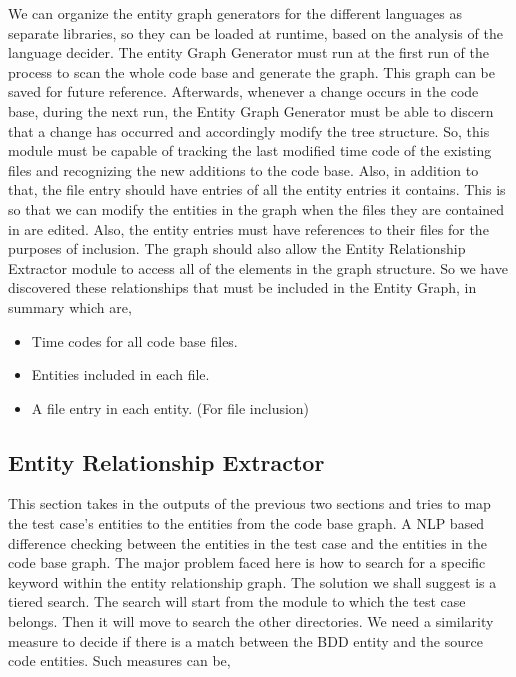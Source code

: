 \documentclass[conference, onecolumn, a4, 12pt]{IEEEtran}
\begin{document}
We can organize the entity graph generators for the different languages as separate libraries, so they can be loaded at runtime, based on the analysis of the language decider. The entity Graph Generator must run at the first run of the process to scan the whole code base and generate the graph. This graph can be saved for future reference. Afterwards, whenever a change occurs in the code base, during the next run, the Entity Graph Generator must be able to discern that a change has occurred and accordingly modify the tree structure. So, this module must be capable of tracking the last modified time code of the existing files and recognizing the new additions to the code base. Also, in addition to that, the file entry should have entries of all the entity entries it contains. This is so that we can modify the entities in the graph when the files they are contained in are edited. Also, the entity entries must have references to their files for the purposes of inclusion. The graph should also allow the Entity Relationship Extractor module to access all of the elements in the graph structure.\newline
So we have discovered these relationships that must be included in the Entity Graph, in summary which are,
\begin{itemize}
	\item Time codes for all code base files.
	\item Entities included in each file.
	\item A file entry in each entity. (For file inclusion)
\end{itemize}

\subsection{Entity Relationship Extractor}
This section takes in the outputs of the previous two sections and tries to map the test case's entities to the entities from the code base graph. A NLP based difference checking between the entities in the test case and the entities in the code base graph. The major problem faced here is how to search for a specific keyword within the entity relationship graph. The solution we shall suggest is a tiered search. The search will start from the module to which the test case belongs. Then it will move to search the other directories.
We need a similarity measure to decide if there is a match between the BDD entity and the source code entities. Such measures can be,
\end{document}
